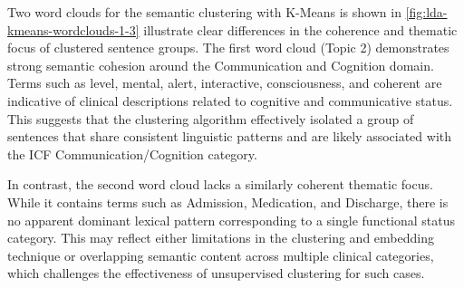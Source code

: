 Two word clouds for the semantic clustering with K-Means is shown in \ref{fig:lda-kmeans-wordclouds-1-3} illustrate clear differences in the coherence and thematic focus of clustered sentence groups. The first word cloud (Topic 2) demonstrates strong semantic cohesion around the Communication and Cognition domain. Terms such as level, mental, alert, interactive, consciousness, and coherent are indicative of clinical descriptions related to cognitive and communicative status. This suggests that the clustering algorithm effectively isolated a group of sentences that share consistent linguistic patterns and are likely associated with the ICF Communication/Cognition category.

In contrast, the second word cloud lacks a similarly coherent thematic focus. While it contains terms such as Admission, Medication, and Discharge, there is no apparent dominant lexical pattern corresponding to a single functional status category. This may reflect either limitations in the clustering and embedding technique or overlapping semantic content across multiple clinical categories, which challenges the effectiveness of unsupervised clustering for such cases.

